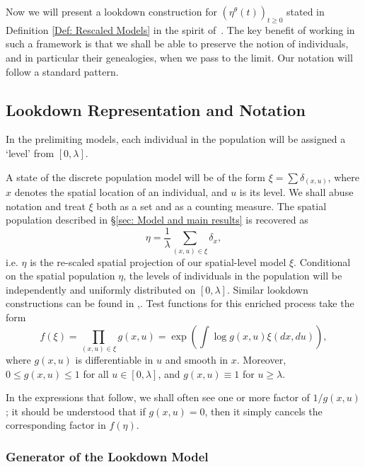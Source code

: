 \documentclass[12pt]{article}
\begin{document}
Now we will present a lookdown construction for $(\eta^{\theta}(t))_{t \geq 0}$
stated in Definition \ref{Def: Rescaled Models} in the spirit of~\cite{kurtz/rodrigues:2011}. 
The key benefit of working in such a framework is that
we shall be able to preserve the notion of individuals,
and in particular their genealogies,
when we pass to the limit.
Our notation will follow a standard pattern.

\subsection{Lookdown Representation and Notation}
\label{sec: Lookdown Representation and Notation}

In the prelimiting models,
each individual in the population
will be assigned a `level' from $[0,\lambda]$.


A state of the discrete population model will be of the form $\xi=\sum\delta_{(x,u)}$,
where $x$ denotes the spatial location
of an individual, and $u$ is its level.
We shall abuse notation and treat $\xi$ both as a set and as a counting measure.
The spatial population described in \S \ref{sec: Model and main results} is recovered as
$$\eta=\frac{1}{\lambda}\sum_{(x,u)\in\xi}\delta_x,$$
i.e. $\eta$ is the re-scaled spatial projection of our spatial-level model $\xi$. 
Conditional on the spatial population $\eta$,
the levels of individuals in the population
will be independently and uniformly distributed
on $[0,\lambda]$.
Similar lookdown constructions can be found 
in \cite{etheridge/kurtz:2018},\cite{kurtz/rodrigues:2011}.
Test functions for this enriched process take the form
\begin{equation}
\label{test functions}
f(\xi)=\prod_{(x,u)\in \xi}g(x,u)=\exp\left(\int \log g(x,u)\xi(dx, du)\right),
\end{equation}
where $g(x,u)$ is differentiable in $u$ and 
smooth in $x$.
Moreover, $0\leq g(x,u) \leq 1$ for all $u\in [0,\lambda]$,
and $g(x,u)\equiv 1$ for $u\geq \lambda$.

In the expressions that follow,
we shall often see one or more factor of $1/g(x,u)$;
it should be understood that if $g(x,u)=0$,
then it simply cancels 
the corresponding factor in $f(\eta)$.

\subsubsection*{Generator of the Lookdown Model}
\end{document}
